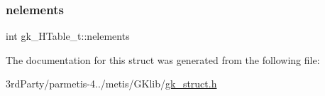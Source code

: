 \mbox{\label{structgk___h_table__t_a71acd4583496d0d4c5cb8dfbaaf478a7}} 
\subsubsection{\texorpdfstring{nelements}{nelements}}
{\footnotesize\ttfamily int gk\+\_\+\+H\+Table\+\_\+t\+::nelements}



The documentation for this struct was generated from the following file\+:\begin{DoxyCompactItemize}
\item 
3rd\+Party/parmetis-\/4../metis/\+G\+Klib/\hyperlink{gk__struct_8h}{gk\+\_\+struct.\+h}\end{DoxyCompactItemize}

